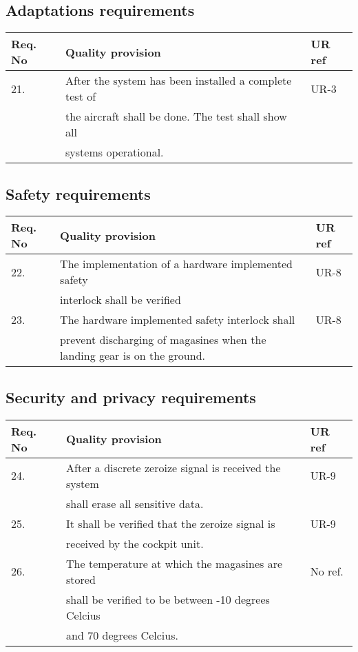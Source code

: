 \subsection{Adaptations requirements}
\begin{center}
    \begin{tabular}{ | l | p{9cm} | l |}
    \hline
    Req. No & Quality provision  									& UR ref \\ \hline
		21. & After the system has been installed a complete test of& UR-3 \\
			& the aircraft shall be done. The test shall show all 	&\\
			& systems operational. 									&\\ \hline
    \end{tabular}
\end{center}


\subsection{Safety requirements}
\begin{center}
    \begin{tabular}{ | l | p{9cm} | l |}
    \hline
    Req. No & Quality provision  									& UR ref \\ \hline
		22. & The implementation of a hardware implemented safety  	& UR-8 \\ 
			& interlock shall be verified 							&\\ \hline
		23. & The hardware implemented safety interlock shall 		& UR-8\\ 
			& prevent discharging of magasines when the landing gear is on the ground.										&\\ \hline	
    \end{tabular}
\end{center}



\subsection{Security and privacy requirements}
\begin{center}
    \begin{tabular}{ | l | p{9cm} | l |}
    \hline
    Req. No & Quality provision  									& UR ref \\ \hline
		24. & After a discrete zeroize signal is received the system& UR-9 \\
			& shall erase all sensitive data. 						&\\ \hline
		25. & It shall be verified that the zeroize signal is		& UR-9 \\
			& received by the cockpit unit.							&\\ \hline
		26. & The temperature at which the magasines are stored		& No ref. \\
			& shall be verified to be between -10 degrees Celcius 	&\\
			& and 70 degrees Celcius.								&\\ \hline
    \end{tabular}
\end{center}
